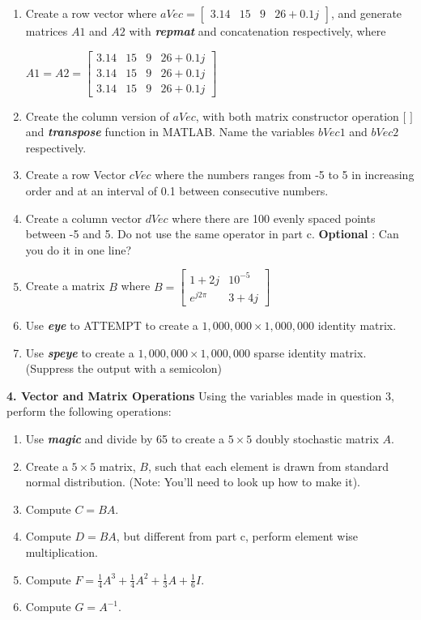 \documentclass[11pt]{article}
\newenvironment{qparts}{\begin{enumerate}[{(}a{)}]}{\end{enumerate}}
\begin{document}
\begin{qparts}
\item
Create a row vector where $ aVec = \begin{bmatrix}3.14&15&9&26+0.1j\end{bmatrix}$, and generate matrices $A1$ and $A2$ with \textbf{\textit{repmat}} and concatenation respectively, where 

$A1 = A2 = \begin{bmatrix}3.14&15&9& 26+0.1j \\ 3.14&15&9&26+0.1j\\3.14&15&9&26+0.1j\end{bmatrix}$ 
\item
Create the column version of $aVec$, with both matrix constructor operation $[$ $]$ and \textbf{\textit{transpose}} function in MATLAB. Name the variables $bVec1$ and $bVec2$ respectively.    
\item  
Create a row Vector $cVec$ where the numbers ranges from -5 to 5 in increasing order and at an interval of 0.1 between consecutive numbers. 
\item
Create a column vector $dVec$ where there are 100 evenly spaced points between -5 and 5. Do not use the same operator in part c. \textbf{Optional} : Can you do it in one line?
\item
Create a matrix $B$ where $B = \begin{bmatrix} 1+2j&10^{-5}\\ e^{j2\pi}&3+4j \end{bmatrix}$
\item 
Use \textbf{\textit{eye}} to ATTEMPT to create a $1,000,000 \times 1,000,000$ identity matrix.
\item
Use \textbf{\textit{speye}} to create a $1,000,000 \times 1,000,000$ sparse identity matrix. (Suppress the output with a semicolon)
\end{qparts}

\noindent \textbf{4. Vector and Matrix Operations} Using the variables made in question 3, perform the following operations:
\begin{qparts}
\item
Use \textbf{\textit{magic}} and divide by 65 to create a $5 \times 5$ doubly stochastic matrix $A$.
\item
Create a $5 \times 5$ matrix, $B$, such that each element is drawn from standard normal distribution. (Note: You'll need to look up how to make it).
\item
Compute $C = BA$.
\item
Compute $D = BA$, but different from part c, perform element wise multiplication.
\item
Compute $F = \frac{1}{4}A^3 + \frac{1}{4}A^2 + \frac{1}{3}A + \frac{1}{6}I$. 
\item
Compute $G = A^{-1}$.
\end{qparts}
\end{document}
